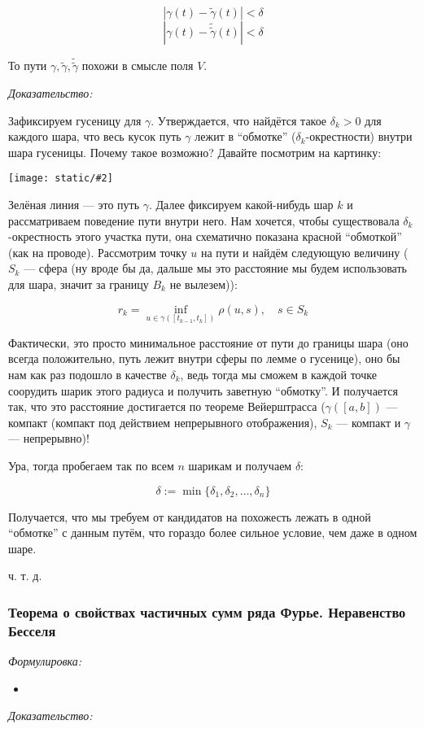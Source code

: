 \documentclass{article}
\def\images#1#2{\begin{center}\texttt{[image: static/\#2]}\end{center}}
\begin{document}
\[|\gamma(t) - \tilde{\gamma}(t)| < \delta\]
\[|\gamma(t) - \tilde{\tilde{\gamma}}(t)| < \delta\]

То пути $\gamma, \tilde{\gamma}, \tilde{\tilde{\gamma}}$ похожи в смысле поля $V$.

\textit{Доказательство:}

Зафиксируем гусеницу для $\gamma$. Утверждается, что найдётся такое $\delta_k > 0$ для каждого шара, что весь кусок путь $\gamma$ лежит в ``обмотке'' ($\delta_k$-окрестности) внутри шара гусеницы. Почему такое возможно? Давайте посмотрим на картинку:

\images{0.35}{lemm_blz_dann.jpg}

Зелёная линия --- это путь $\gamma$. Далее фиксируем какой-нибудь шар $k$ и рассматриваем поведение пути внутри него. Нам хочется, чтобы существовала $\delta_k$-окрестность этого участка пути, она схематично показана красной ``обмоткой'' (как на проводе). Рассмотрим точку $u$ на пути и найдём следующую величину ($S_k$ --- сфера (ну вроде бы да, дальше мы это расстояние мы будем использовать для шара, значит за границу $B_k$ не вылезем)):

\[r_k = \inf_{u \in \gamma([t_{k - 1}, t_k])} \rho(u, s), \quad s \in S_k\]

Фактически, это просто минимальное расстояние от пути до границы шара (оно всегда положительно, путь лежит внутри сферы по лемме о гусенице), оно бы нам как раз подошло в качестве $\delta_k$, ведь тогда мы сможем в каждой точке соорудить шарик этого радиуса и получить заветную ``обмотку''. И получается так, что это расстояние достигается по теореме Вейерштрасса ($\gamma([a, b])$ --- компакт (компакт под действием непрерывного отображения), $S_k$ --- компакт и $\gamma$ --- непрерывно)!

Ура, тогда пробегаем так по всем $n$ шарикам и получаем $\delta$:

\[\delta := \min \{ \delta_1, \delta_2, \ldots, \delta_n \} \]

Получается, что мы требуем от кандидатов на похожесть лежать в одной ``обмотке'' с данным путём, что гораздо более сильное условие, чем даже в одном шаре.

ч. т. д. 

\subsubsection{Теорема о свойствах частичных сумм ряда Фурье. Неравенство Бесселя}
\textit{Формулировка:}

\begin{itemize}
    \item 
\end{itemize}

\textit{Доказательство:}
\end{document}
